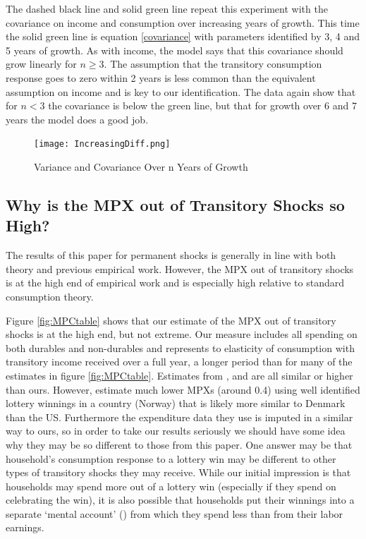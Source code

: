 \documentclass[titlepage]{\econtex}\newcommand{\texname}{IncomeUncertainty}
\begin{document}
The dashed black line and solid green line repeat this experiment with the covariance on income and consumption over increasing years of growth. This time the solid green line is equation \ref{covariance} with parameters identified by 3, 4 and 5 years of growth. As with income, the model says that this covariance should grow linearly for $n \geq 3$. The assumption that the transitory consumption response goes to zero within 2 years is less common than the equivalent assumption on income and is key to our identification. The data again show that for $n < 3$ the covariance is below the green line, but that for growth over 6 and 7 years the model does a good job.
\begin{figure} 
	\begin{centering}
		\texttt{[image: IncreasingDiff.png]}
		\caption{Variance and Covariance Over n Years of Growth}
		\label{fig:IncreasingDiff}
	\end{centering}
\end{figure}

\subsection{Why is the MPX out of Transitory Shocks so High?} \label{whysohigh}
The results of this paper for permanent shocks is generally in line with both theory and previous empirical work. However, the MPX out of transitory shocks is at the high end of empirical work and is especially high relative to standard consumption theory.

Figure \ref{fig:MPCtable} shows that our estimate of the MPX out of transitory shocks is at the high end, but not extreme. Our measure includes all spending on both durables and non-durables and represents to elasticity of consumption with transitory income received over a full year, a longer period than for many of the estimates in figure \ref{fig:MPCtable}. Estimates from \cite{agarwal_consumption_2014}, \cite{parker_consumer_2013} and \cite{souleles_response_1999} are all similar or higher than ours. However, \cite{fagereng_mpc_2016} estimate much lower MPXs (around 0.4) using well identified lottery winnings in a country (Norway) that is likely more similar to Denmark than the US. Furthermore the expenditure data they use is imputed in a similar way to ours, so in order to take our results seriously we should have some idea why they may be so different to those from this paper. One answer may be that household's consumption response to a lottery win may be different to other types of transitory shocks they may receive. While our initial impression is that households may spend more out of a lottery win (especially if they spend on celebrating the win), it is also possible that households put their winnings into a separate `mental account' (\cite{thaler_mental_1985}) from which they spend less than from their labor earnings.
\end{document}
